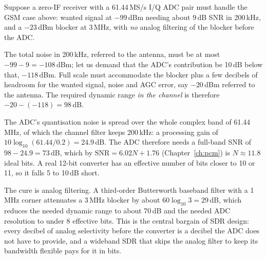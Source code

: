 
\begin{worked}
Suppose a zero-IF receiver with a 61.44\,MS/s I/Q ADC pair must handle the GSM case above: wanted
signal at $-99$\,dBm needing about 9\,dB SNR in 200\,kHz, and a $-23$\,dBm blocker at 3\,MHz, with
\emph{no} analog filtering of the blocker before the ADC.

The total noise in 200\,kHz, referred to the antenna, must be at most $-99-9=-108$\,dBm; let us demand that
the ADC's contribution be 10\,dB below that, $-118$\,dBm. Full scale must accommodate the blocker plus a
few decibels of headroom for the wanted signal, noise and AGC error, say $-20$\,dBm referred to the
antenna. The required dynamic range \emph{in the channel} is therefore $-20-(-118)=98$\,dB.

The ADC's quantisation noise is spread over the whole complex band of 61.44\,MHz, of which the channel
filter keeps 200\,kHz: a processing gain of $10\log_{10}(61.44/0.2)=24.9$\,dB. The ADC therefore needs a
full-band SNR of $98-24.9=73$\,dB, which by $\text{SNR}=6.02N+1.76$ (Chapter~\ref{ch:pcm}) is
$N\approx11.8$ ideal bits. A real 12-bit converter has an effective number of bits closer to 10 or 11,
so it falls 5 to 10\,dB short.

The cure is analog filtering. A third-order Butterworth baseband filter with a 1\,MHz corner attenuates
a 3\,MHz blocker by about $60\log_{10}3=29$\,dB, which reduces the needed dynamic range to about 70\,dB and
the needed ADC resolution to under 8 effective bits. This is the central bargain of SDR design: every
decibel of analog selectivity before the converter is a decibel the ADC does not have to provide, and a
wideband SDR that skips the analog filter to keep its bandwidth flexible pays for it in bits.
\end{worked}


